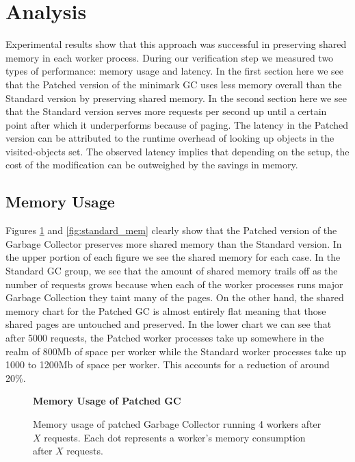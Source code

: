 \documentclass{article}
\begin{document}
\begin{sloppypar}
\section{Analysis}\label{sec:analysis}

Experimental results show that this approach was successful in preserving shared memory in each worker process.  During our verification step we measured two types of performance:  memory usage and latency.  In the first section here we see that the Patched version of the minimark GC uses less memory overall than the Standard version by preserving shared memory.  In the second section here we see that the Standard version serves more requests per second up until a certain point after which it underperforms because of paging.  The latency in the Patched version can be attributed to the runtime overhead of looking up objects in the visited-objects set.  The observed latency implies that depending on the setup, the cost of the modification can be outweighed by the savings in memory.  

\subsection{Memory Usage}

Figures \ref{fig:patched_mem} and \ref{fig:standard_mem} clearly show that the Patched version of the Garbage Collector preserves more shared memory than the Standard version.  In the upper portion of each figure we see the shared memory for each case.  In the Standard GC group, we see that the amount of shared memory trails off as the number of requests grows because when each of the worker processes runs major Garbage Collection they taint many of the pages.  On the other hand, the shared memory chart for the Patched GC is almost entirely flat meaning that those shared pages are untouched and preserved.  In the lower chart we can see that after 5000 requests, the Patched worker processes take up somewhere in the realm of 800Mb of space per worker while the Standard worker processes take up 1000 to 1200Mb of space per worker.  This accounts for a reduction of around 20\%.

\begin{figure}
    \begin{center}\textbf{Memory Usage of Patched GC}\end{center}
    \resizebox{0.5\textwidth}{!}{}
    \caption{Memory usage of patched Garbage Collector running 4 workers after $X$ requests.  Each dot represents a worker's memory consumption after $X$ requests.}\label{fig:patched_mem}
\end{figure}


\end{sloppypar}
\end{document}

